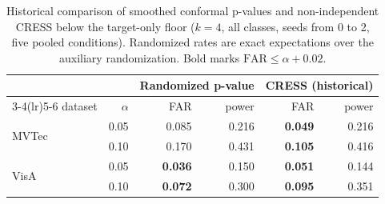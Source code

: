 \begin{table}[pos=t]
\centering
\caption{Historical comparison of smoothed conformal p-values and non-independent CRESS below the target-only floor ($k{=}4$, all classes, seeds from 0 to 2, five pooled conditions). Randomized rates are exact expectations over the auxiliary randomization. Bold marks $\mathrm{FAR}\le\alpha{+}0.02$.}
\label{tab:randomized-pvalue}
\footnotesize
\setlength{\tabcolsep}{4pt}
\begin{tabular}{lrrrrr}
\toprule
 & & \multicolumn{2}{c}{Randomized p-value} & \multicolumn{2}{c}{CRESS (historical)} \\
\cmidrule(lr){3-4}\cmidrule(lr){5-6}
dataset & $\alpha$ & FAR & power & FAR & power \\
\midrule
\multirow{2}{*}{MVTec} & 0.05 & 0.085 & 0.216 & \textbf{0.049} & 0.216 \\
 & 0.10 & 0.170 & 0.431 & \textbf{0.105} & 0.416 \\
\midrule
\multirow{2}{*}{VisA} & 0.05 & \textbf{0.036} & 0.150 & \textbf{0.051} & 0.144 \\
 & 0.10 & \textbf{0.072} & 0.300 & \textbf{0.095} & 0.351 \\
\bottomrule
\end{tabular}
\end{table}

